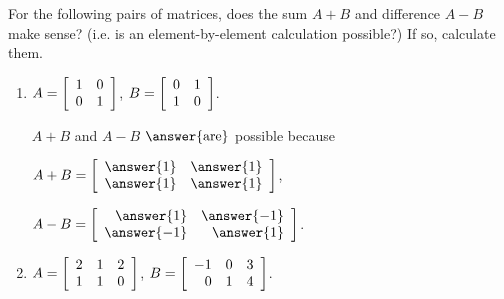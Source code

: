 \documentclass{ximera}
\author{Zack Reed}
\renewenvironment{mymatrix}[1]
  {%
   \left[\begin{array}{#1}}
  {%
   \end{array}\right]}
\begin{document}
\begin{problem}
  For the following pairs of matrices, does the sum $A+B$ and difference $A-B$ make sense? (i.e. is an element-by-element calculation possible?) If so, calculate them.
  \begin{enumerate}
  \item
    $A = \begin{mymatrix}{rr}
      1 & 0 \\
      0 & 1
    \end{mymatrix}$,\quad
    $B = \begin{mymatrix}{rr}
      0 & 1 \\
      1 & 0
    \end{mymatrix}$.

    \begin{sol}
    

      $A+B$ and $A-B$ $\answer{\text{are}}$ possible because 

      \begin{selectAll}
      \end{selectAll}

      $A+B = \begin{mymatrix}{rr}
        \answer{1} & \answer{1} \\
        \answer{1} & \answer{1}
      \end{mymatrix}$,\quad

      $A-B = \begin{mymatrix}{rr}
        \answer{1} & \answer{-1} \\
        \answer{-1} & \answer{1}
      \end{mymatrix}$.


    \end{sol}

  \item
    $A = \begin{mymatrix}{rrr}
      2 & 1 & 2 \\
      1 & 1 & 0
    \end{mymatrix}$,\quad
    $B = \begin{mymatrix}{rrr}
      -1 & 0 & 3 \\
      0 & 1 & 4
    \end{mymatrix}$.


\end{enumerate}
\end{problem}
\end{document}

